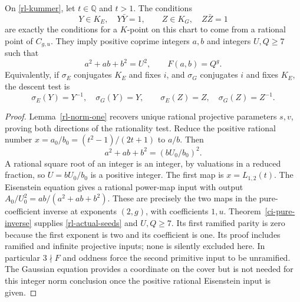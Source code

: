 \begin{theorem}\label{rl-descent}
On \eqref{rl-kummer}, let $t\in\mathbb Q$ and $t>1$.
The conditions
\begin{equation}\label{rl-norm-tests}
 Y\in K_E,\quad Y\bar Y=1,\qquad
 Z\in K_G,\quad Z\bar Z=1
\end{equation}
are exactly the conditions for a $K$-point on this chart to come
from a rational point of $C_{g,u}$. They imply positive coprime
integers $a,b$ and integers $U,Q\geq7$ such that
\begin{equation}\label{rl-actual-seeds}
 a^2+ab+b^2=U^2,\qquad F(a,b)=Q^g.
\end{equation}
Equivalently, if $\sigma_E$ conjugates $K_E$ and fixes $i$, and
$\sigma_G$ conjugates $i$ and fixes $K_E$, the descent test is
\[
 \sigma_E(Y)=Y^{-1},\quad \sigma_G(Y)=Y,\qquad
 \sigma_E(Z)=Z,\quad \sigma_G(Z)=Z^{-1}.
\]
\end{theorem}
\begin{proof}
Lemma~\ref{rl-norm-one} recovers unique rational projective
parameters $s,v$, proving both directions of the rationality test.
Reduce the positive rational number
$x=a_0/b_0=(t^2-1)/(2t+1)$ to $a/b$. Then
\[
 a^2+ab+b^2=(bU_0/b_0)^2.
\]
A rational square root of an integer is an integer, by valuations
in a reduced fraction, so $U=bU_0/b_0$ is a positive integer.
The first map is $x=L_{1,2}(t)$. The Eisenstein equation gives a
rational power-map input with output
$A_0/U_0^2=ab/(a^2+ab+b^2)$. These are precisely the two maps
in the pure-coefficient inverse at exponents $(2,g)$, with
coefficients $1,u$. Theorem~\ref{ci-pure-inverse} supplies
\eqref{rl-actual-seeds} and $U,Q\geq7$. Its first ramified parity
is zero because the first exponent is two and its coefficient is
one. Its proof includes ramified and infinite projective inputs;
none is silently excluded here. In particular $3\nmid F$ and
oddness force the second primitive input to be unramified.
The Gaussian equation provides a coordinate on the cover but is
not needed for this integer norm conclusion once the positive
rational Eisenstein input is given.
\end{proof}

